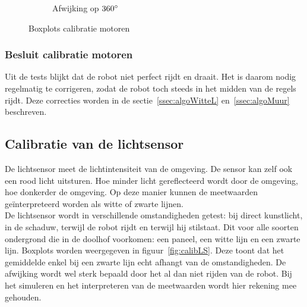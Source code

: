 \documentclass[eind]{penoverslag}
\begin{document}
\begin{figure}
\begin{subfigure}[h]{0.32\textwidth}
                \caption{Afwijking op $360 \degree$}
        \end{subfigure}
 \caption{Boxplots calibratie motoren}
\label{fig:calibM}
\end{figure}

\subsubsection{Besluit calibratie motoren} %
\label{ssec:calibMbesluit}
Uit de tests blijkt dat de robot niet perfect rijdt en draait. Het is daarom nodig regelmatig te corrigeren, zodat de robot toch steeds in het midden van de regels rijdt. Deze correcties worden in de sectie~\ref{ssec:algoWitteL} en~\ref{ssec:algoMuur} beschreven.


\subsection{Calibratie van de lichtsensor} %
\label{ssec:calibLS}
De lichtsensor meet de lichtintensiteit van de omgeving. De sensor kan zelf ook een rood licht uitsturen. Hoe minder licht gereflecteerd wordt door de omgeving, hoe donkerder de omgeving. Op deze manier kunnen de meetwaarden ge\"interpreteerd worden als witte of zwarte lijnen.\\
De lichtsensor wordt in verschillende omstandigheden getest: bij direct kunstlicht, in de schaduw, terwijl de robot rijdt en terwijl hij stilstaat. Dit voor alle soorten ondergrond die in de doolhof voorkomen: een paneel, een witte lijn en een zwarte lijn. Boxplots worden weergegeven in figuur~\ref{fig:calibLS}. Deze toont dat het gemiddelde enkel bij een zwarte lijn echt afhangt van de omstandigheden. De afwijking wordt wel sterk bepaald door het al dan niet rijden van de robot. Bij het simuleren en het interpreteren van de meetwaarden wordt hier rekening mee gehouden.
\end{document}
